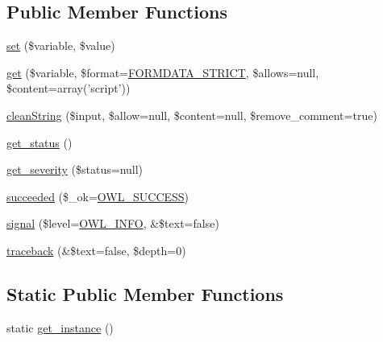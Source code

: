 \subsection*{Public Member Functions}
\begin{DoxyCompactItemize}
\item 
\hyperlink{classFormHandler_a5fcc8aef0de87e31ceee65ad1eadb96c}{set} (\$variable, \$value)
\item 
\hyperlink{classFormHandler_a4dbeaa44aa51a795b16379ae703d893a}{get} (\$variable, \$format=\hyperlink{class_8formhandler_8php_af5de9385d7f7fc802eaa8e7090d8e0f5}{FORMDATA\_\-STRICT}, \$allows=null, \$content=array('script'))
\item 
\hyperlink{classFormHandler_a5ee0cda14dcbe0b6e12226db4bd951a0}{cleanString} (\$input, \$allow=null, \$content=null, \$remove\_\-comment=true)
\item 
\hyperlink{class__OWL_a99ec771fa2c5c279f80152cc09e489a8}{get\_\-status} ()
\item 
\hyperlink{class__OWL_adf9509ef96858be7bdd9414c5ef129aa}{get\_\-severity} (\$status=null)
\item 
\hyperlink{class__OWL_ae76c46aff1ad253106332670fc59c777}{succeeded} (\$\_\-ok=\hyperlink{owl_8severitycodes_8php_a96223f06ba27bf5cbefa6e9d702897c2}{OWL\_\-SUCCESS})
\item 
\hyperlink{class__OWL_a51ba4a16409acf2a2f61f286939091a5}{signal} (\$level=\hyperlink{owl_8severitycodes_8php_a139328861128689f2f4def6a399d9057}{OWL\_\-INFO}, \&\$text=false)
\item 
\hyperlink{class__OWL_aa29547995d6741b7d2b90c1d4ea99a13}{traceback} (\&\$text=false, \$depth=0)
\end{DoxyCompactItemize}
\subsection*{Static Public Member Functions}
\begin{DoxyCompactItemize}
\item 
static \hyperlink{classFormHandler_ad5b352905583faed17034459f1a9ea6c}{get\_\-instance} ()
\end{DoxyCompactItemize}
